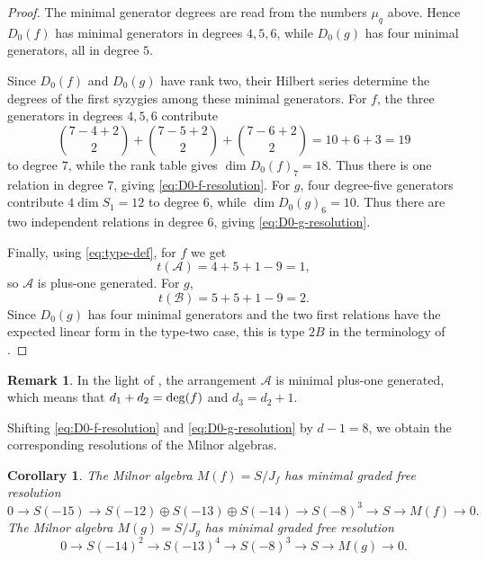 \documentclass[11pt]{amsart}
\newcommand{\cA}{\mathcal A}
\newcommand{\cB}{\mathcal B}
\theoremstyle{plain}
\newtheorem{corollary}[theorem]{Corollary}
\theoremstyle{definition}
\newtheorem{remark}[theorem]{Remark}
\numberwithin{equation}{section}
\begin{document}
\begin{proof}
The minimal generator degrees are read from the numbers \(\mu_q\) above.  Hence \(D_0(f)\) has minimal generators in degrees \(4,5,6\), while \(D_0(g)\) has four minimal generators, all in degree \(5\).

Since \(D_0(f)\) and \(D_0(g)\) have rank two, their Hilbert series determine the degrees of the first syzygies among these minimal generators.  For \(f\), the three generators in degrees \(4,5,6\) contribute
\[
\binom{7-4+2}{2}+\binom{7-5+2}{2}+\binom{7-6+2}{2}=10+6+3=19
\]
to degree \(7\), while the rank table gives \(\dim D_0(f)_7=18\).  Thus there is one relation in degree \(7\), giving \eqref{eq:D0-f-resolution}.  For \(g\), four degree-five generators contribute \(4\dim S_1=12\) to degree \(6\), while \(\dim D_0(g)_6=10\).  Thus there are two independent relations in degree \(6\), giving \eqref{eq:D0-g-resolution}.

Finally, using \eqref{eq:type-def}, for \(f\) we get
\[
t(\cA)=4+5+1-9=1,
\]
so \(\cA\) is plus-one generated.  For \(g\),
\[
t(\cB)=5+5+1-9=2.
\]
Since \(D_0(g)\) has four minimal generators and the two first relations have the expected linear form in the type-two case, this is type \(2B\) in the terminology of \cite{ADP}.
\end{proof}
\begin{remark}
In the light of \cite[Definition 1.1]{mpog}, the arrangement $\mathcal{A}$ is minimal plus-one generated, which means that $d_{1}+d_{2} = {\rm deg}(f)$ and $d_{3}=d_{2}+1$.
\end{remark}
Shifting \eqref{eq:D0-f-resolution} and \eqref{eq:D0-g-resolution} by \(d-1=8\), we obtain the corresponding resolutions of the Milnor algebras.

\begin{corollary}\label{cor:Milnor-resolutions}
The Milnor algebra \(M(f)=S/J_f\) has minimal graded free resolution
\begin{equation}\label{eq:Mf-resolution}
0\longrightarrow S(-15)
\longrightarrow S(-12)\oplus S(-13)\oplus S(-14)
\longrightarrow S(-8)^3
\longrightarrow S
\longrightarrow M(f)
\longrightarrow 0.
\end{equation}
The Milnor algebra \(M(g)=S/J_g\) has minimal graded free resolution
\begin{equation}\label{eq:Mg-resolution}
0\longrightarrow S(-14)^2
\longrightarrow S(-13)^4
\longrightarrow S(-8)^3
\longrightarrow S
\longrightarrow M(g)
\longrightarrow 0.
\end{equation}
\end{corollary}
\end{document}
